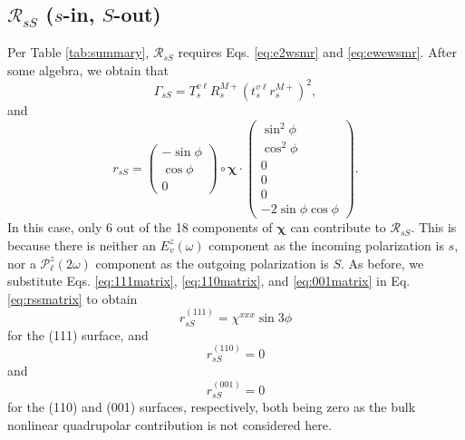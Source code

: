 \documentclass[aps,pra,10pt,amsmath,notitlepage,letterpaper]{revtex4-1}
\begin{document}
\subsection{\texorpdfstring{$\mathcal{R}_{sS}$ ($s$-in, $S$-out)}{RsS (s-in,
S-out)}}
\label{sec:RsS}

Per Table \ref{tab:summary}, $\mathcal{R}_{sS}$ requires Eqs. \eqref{eq:e2wsmr}
and \eqref{eq:ewewsmr}. After some algebra, we obtain that
\begin{equation}
\Gamma_{sS} = 
T_{s}^{v\ell}R^{M+}_{s}\left(t^{v\ell}_{s}r^{M+}_{s}\right)^{2},
\end{equation}
and
\begin{equation}\label{eq:rssmatrix}
r_{sS}=
\begin{pmatrix}
-\sin\phi\\
\cos\phi\\
0
\end{pmatrix}
\circ
\boldsymbol{\chi}
\cdot
\begin{pmatrix}
\sin^{2}\phi\\
\cos^{2}\phi\\
0\\
0\\
0\\
- 2\sin\phi\cos\phi
\end{pmatrix}
.
\end{equation}
In this case, only 6 out of the 18 components of $\boldsymbol{\chi}$ can
contribute to $\mathcal{R}_{sS}$. This is because there is neither an
$E^{z}_v(\omega)$ component as the incoming polarization is $s$, nor a
$\mathcal{P}^{z}_\ell(2\omega)$ component as the outgoing polarization is $S$.
As before, we substitute Eqs. \eqref{eq:111matrix}, \eqref{eq:110matrix}, and
\eqref{eq:001matrix} in Eq. \eqref{eq:rssmatrix} to obtain
\begin{equation}\label{eq:rss111}
r^{(111)}_{sS} = \chi^{xxx}\sin3\phi
\end{equation}
for the (111) surface, and 
\begin{equation}\label{eq:rss110}
r^{(110)}_{sS} = 0
\end{equation}
and
\begin{equation}\label{eq:rss001}
r^{(001)}_{sS} = 0
\end{equation}
for the (110) and (001) surfaces, respectively, both being zero as the bulk
nonlinear quadrupolar contribution is not considered here.\cite{sipePRB87}


\end{document}
